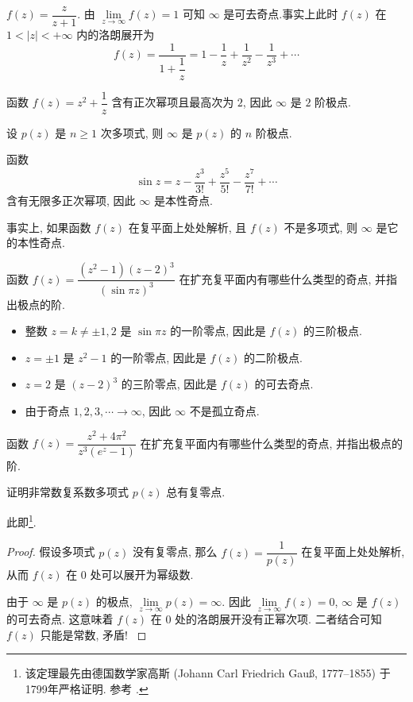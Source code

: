 \begin{example}
		$f(z)=\dfrac z{z+1}$.
	由 $\lim\limits_{z\to\infty}f(z)=1$ 可知 $\infty$ 是可去奇点.事实上此时 $f(z)$ 在 $1<|z|<+\infty$ 内的洛朗展开为
		\[f(z)=\frac{1}{1+\dfrac1z}=1-\frac1z+\frac1{z^2}-\frac1{z^3}+\cdots\]
\end{example}

\begin{example}
		函数 $f(z)=z^2+\dfrac1z$
	{含有正次幂项且最高次为 $2$, 因此 $\infty$ 是 $2$ 阶极点.
	}
\end{example}

\begin{example}
		设 $p(z)$ 是 $n\ge1$ 次多项式,
	{则 $\infty$ 是 $p(z)$ 的 $n$ 阶极点.
	}
\end{example}

\begin{example}
		函数 
		\[\sin z=z-\frac{z^3}{3!}+\frac{z^5}{5!}-\frac{z^7}{7!}+\cdots\]
	{含有无限多正次幂项, 因此 $\infty$ 是本性奇点.
	}

	{事实上, 如果函数 $f(z)$ 在复平面上处处解析, 且 $f(z)$ 不是多项式, 则 $\infty$ 是它的本性奇点.
	}
\end{example}

\begin{example}
	函数 $f(z)=\dfrac{(z^2-1)(z-2)^3}{(\sin{\pi z})^3}$ 在扩充复平面内有哪些什么类型的奇点, 并指出极点的阶.
\end{example}

\begin{solution}
	\begin{itemize}
		\item 整数 $z=k\neq \pm1,2$ 是 $\sin{\pi z}$ 的一阶零点, 因此是 $f(z)$ 的三阶极点.
		\item $z=\pm1$ 是 $z^2-1$ 的一阶零点, 因此是 $f(z)$ 的二阶极点.
		\item $z=2$ 是 $(z-2)^3$ 的三阶零点, 因此是 $f(z)$ 的可去奇点.
		\item 由于奇点 $1,2,3,\cdots\to \infty$, 因此 $\infty$ 不是孤立奇点.
	\end{itemize}
\end{solution}

\begin{exercise}
	函数 $f(z)=\dfrac{z^2+4\pi^2}{z^3(e^z-1)}$ 在扩充复平面内有哪些什么类型的奇点, 并指出极点的阶.
\end{exercise}

\begin{example}
	证明非常数复系数多项式 $p(z)$ 总有复零点.
\end{example}
此即\footnote{
	该定理最先由德国数学家高斯 (Johann Carl Friedrich Gauß, 1777--1855) 于1799年严格证明.
	参考 \cite[第25章1节]{Kline1990}.
}.
\begin{proof}
	假设多项式 $p(z)$ 没有复零点, 那么 $f(z)=\dfrac1{p(z)}$ 在复平面上处处解析, 
{%
	从而 $f(z)$ 在 $0$ 处可以展开为幂级数.
}

{%
	由于 $\infty$ 是 $p(z)$ 的极点, $\lim\limits_{z\to\infty}p(z)=\infty$.
}%
{%
	因此 $\lim\limits_{z\to\infty}f(z)=0$, $\infty$ 是 $f(z)$ 的可去奇点.
}%
{%
	这意味着 $f(z)$ 在 $0$ 处的洛朗展开没有正幂次项.
}%
{%
	二者结合可知 $f(z)$ 只能是常数, 矛盾!\qedhere
}
\end{proof}

